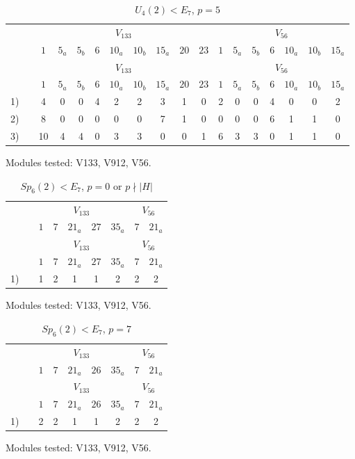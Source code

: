 \setcounter{table}{222}
\begin{longtable}{rc|ccccccccc|ccccccc}
\caption{$U_4(2) < E_7$, $p = 5$}\\
& & \multicolumn{9}{c|}{$V_{133}$} & \multicolumn{7}{c}{$V_{56}$} \\
& & $1$ & $5_{a}$ & $5_{b}$ & $6$ & $10_{a}$ & $10_{b}$ & $15_{a}$ & $20$ & $23$ & $1$ & $5_{a}$ & $5_{b}$ & $6$ & $10_{a}$ & $10_{b}$ & $15_{a}$ \\ \hline
\endfirsthead
& & \multicolumn{9}{c|}{$V_{133}$} & \multicolumn{7}{c}{$V_{56}$} \\
& & $1$ & $5_{a}$ & $5_{b}$ & $6$ & $10_{a}$ & $10_{b}$ & $15_{a}$ & $20$ & $23$ & $1$ & $5_{a}$ & $5_{b}$ & $6$ & $10_{a}$ & $10_{b}$ & $15_{a}$ \\ \hline
\endhead
1) &  & 4 & 0 & 0 & 4 & 2 & 2 & 3 & 1 & 0 & 2 & 0 & 0 & 4 & 0 & 0 & 2 \\
2) &  & 8 & 0 & 0 & 0 & 0 & 0 & 7 & 1 & 0 & 0 & 0 & 0 & 6 & 1 & 1 & 0 \\
3) &  & 10 & 4 & 4 & 0 & 3 & 3 & 0 & 0 & 1 & 6 & 3 & 3 & 0 & 1 & 1 & 0 \\
\end{longtable}
\noindent Modules tested: V133, V912, V56.\\

\setcounter{table}{223}
\begin{longtable}{rc|ccccc|cc}
\caption{$Sp_6(2) < E_7$, $p = 0$ or $p \nmid |H|$}\\
& & \multicolumn{5}{c|}{$V_{133}$} & \multicolumn{2}{c}{$V_{56}$} \\
& & $1$ & $7$ & $21_{a}$ & $27$ & $35_{a}$ & $7$ & $21_{a}$ \\ \hline
\endfirsthead
& & \multicolumn{5}{c|}{$V_{133}$} & \multicolumn{2}{c}{$V_{56}$} \\
& & $1$ & $7$ & $21_{a}$ & $27$ & $35_{a}$ & $7$ & $21_{a}$ \\ \hline
\endhead
1) &  & 1 & 2 & 1 & 1 & 2 & 2 & 2 \\
\end{longtable}
\noindent Modules tested: V133, V912, V56.\\

\setcounter{table}{224}
\begin{longtable}{rc|ccccc|cc}
\caption{$Sp_6(2) < E_7$, $p = 7$}\\
& & \multicolumn{5}{c|}{$V_{133}$} & \multicolumn{2}{c}{$V_{56}$} \\
& & $1$ & $7$ & $21_{a}$ & $26$ & $35_{a}$ & $7$ & $21_{a}$ \\ \hline
\endfirsthead
& & \multicolumn{5}{c|}{$V_{133}$} & \multicolumn{2}{c}{$V_{56}$} \\
& & $1$ & $7$ & $21_{a}$ & $26$ & $35_{a}$ & $7$ & $21_{a}$ \\ \hline
\endhead
1) &  & 2 & 2 & 1 & 1 & 2 & 2 & 2 \\
\end{longtable}
\noindent Modules tested: V133, V912, V56.\\

